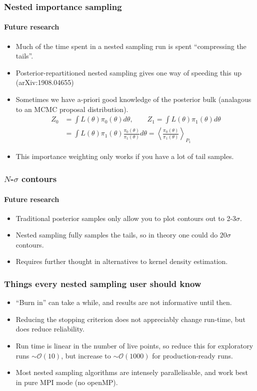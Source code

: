\documentclass[%
]{beamer}
\begin{document}
\begin{frame}
    \frametitle{Nested importance sampling}
    \framesubtitle{Future research}
    \begin{itemize}
        \item Much of the time spent in a nested sampling run is spent ``compressing the tails''.
        \item Posterior-repartitioned nested sampling gives one way of speeding this up (arXiv:1908.04655)
        \item Sometimes we have a-priori good knowledge of the posterior bulk (analagous to an MCMC proposal distribution).
        \begin{align}
            Z_0 &= \int L(\theta) \pi_0(\theta) d\theta, \qquad
            Z_1 = \int L(\theta) \pi_1(\theta) d\theta \nonumber\\
            &= \int L(\theta)\pi_1(\theta) \frac{\pi_0(\theta)}{\pi_1(\theta)} d\theta
            = \left\langle \frac{\pi_0(\theta)}{\pi_1(\theta)} \right\rangle_{P_1}  \nonumber
        \end{align}
        \item This importance weighting only works if you have a lot of tail samples.
    \end{itemize}
\end{frame}

\begin{frame}
    \frametitle{$N$-$\sigma$ contours}
    \framesubtitle{Future research}
    \begin{itemize}
        \item Traditional posterior samples only allow you to plot contours out to 2-3$\sigma$.
        \item Nested sampling fully samples the tails, so in theory one could do $20\sigma$ contours.
        \item Requires further thought in alternatives to kernel density estimation.
    \end{itemize}
\end{frame}

\begin{frame}
    \frametitle{Things every nested sampling user should know}
        \begin{itemize}
            \item ``Burn in'' can take a while, and results are not informative until then.
            \item Reducing the stopping criterion does not appreciably change run-time, but does reduce reliability.
            \item Run time is linear in the number of live points, so reduce this for exploratory runs $\sim\mathcal{O}(10)$, but increase to $\sim\mathcal{O}(1000)$ for production-ready runs.
            \item Most nested sampling algorithms are intensely parallelisable, and work best in pure MPI mode (no openMP).
        \end{itemize}
\end{frame}
\end{document}
